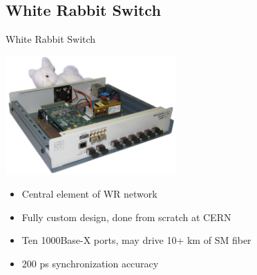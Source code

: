 \documentclass[compress,red]{beamer}
\begin{document}




\subsection {White Rabbit Switch}


\begin{frame}{White Rabbit Switch}
\begin{center}
\includegraphics[width=6.5cm]{../../figures/switch/wrs2_photo.jpg}
\end{center}
\begin{itemize}
\item Central element of WR network
\item Fully custom design, done from scratch at CERN
\item Ten 1000Base-X ports, may drive 10+ km of SM fiber
\item 200 ps synchronization accuracy
\end{itemize}
\end{frame}

\end{document}
